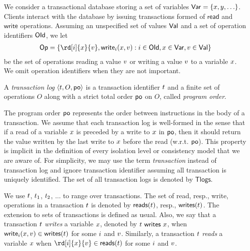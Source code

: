 We consider a transactional database storing a set of variables $\Var=\{\xvar,\yvar,\ldots\}$. Clients interact with the database by issuing transactions formed of $\textsf{read}$ and $\textsf{write}$ operations. Assuming an unspecified set of values $\Val$ and a set of operation identifiers $\OId$, we let 
\begin{align*}
 \Op=\set{\rd[\id]{\xvar}{\val},\wrt[\id]{\xvar}{\val}: \id\in\OId, \xvar\in\Var, \val\in \Val}
\end{align*} 
be the set of operations reading a value $\val$ or writing a value $\val$ to a variable $\xvar$. We omit operation identifiers when they are not important.

\begin{definition}
 A \emph{transaction log} $\tup{\tr, O, \po}$ is a transaction identifier $\tr$ and a finite set of operations $O$ along with a strict total order $\po$ on $O$, called \emph{program order}.
\end{definition}

The program order $\po$ represents the order between instructions in the body of a transaction. We assume that each transaction log is well-formed in the sense that if a read of a variable $\xvar$ is preceded by a write to $\xvar$ in $\po$, then it should return the value written by the last write to $\xvar$ before the read (w.r.t. $\po$). This property is implicit in the definition of every isolation level or consistency model that we are aware of. For simplicity, we may use the term \emph{transaction} instead of transaction log and ignore transaction identifier assuming all transaction is uniquely identified. The  set of all transaction logs is denoted by $\mathsf{Tlogs}$.

We use $\tr$, $\tr_1$, $\tr_2$, $\ldots$ to range over transactions. The set of read, resp., write, operations in a transaction $\tr$ is denoted by $\readOp{\tr}$, resp., $\writeOp{\tr}$. The extension to sets of transactions is defined as usual. Also, we say that a transaction $\tr$ \emph{writes} a variable $\xvar$, denoted by $\writeVar{\tr}{\xvar}$, when $\wrt[\id]{\xvar}{\val}\in \writeOp{\tr}$ for some $\id$ and $\val$. Similarly, a transaction $\tr$ \emph{reads} a variable $\xvar$ when $\rd[\id]{\xvar}{\val}\in \readOp{\tr}$ for some $\id$ and $\val$.

